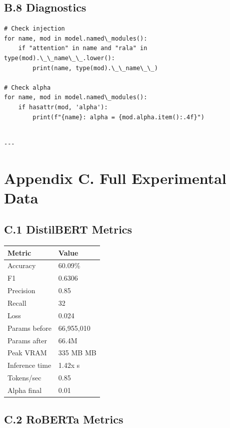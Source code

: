 \subsection{B.8 Diagnostics}

\begin{lstlisting}
# Check injection
for name, mod in model.named\_modules():
    if "attention" in name and "rala" in type(mod).\_\_name\_\_.lower():
        print(name, type(mod).\_\_name\_\_)

# Check alpha
for name, mod in model.named\_modules():
    if hasattr(mod, 'alpha'):
        print(f"{name}: alpha = {mod.alpha.item():.4f}")
\end{lstlisting}
\begin{lstlisting}

---
\end{lstlisting}


\section{Appendix C. Full Experimental Data}

\subsection{C.1 DistilBERT Metrics}

\begin{table}[H]
\centering
\small
\begin{tabular}{ll}
\toprule
\textbf{Metric} & \textbf{Value} \\
\midrule
Accuracy & 60.09\% \\
F1 & 0.6306 \\
Precision & 0.85 \\
Recall & 32 \\
Loss & 0.024 \\
Params before & 66,955,010 \\
Params after & 66.4M \\
Peak VRAM & 335 MB MB \\
Inference time & 1.42x s \\
Tokens/sec & 0.85 \\
Alpha final & 0.01 \\
\bottomrule
\end{tabular}
\end{table}

\subsection{C.2 RoBERTa Metrics}

